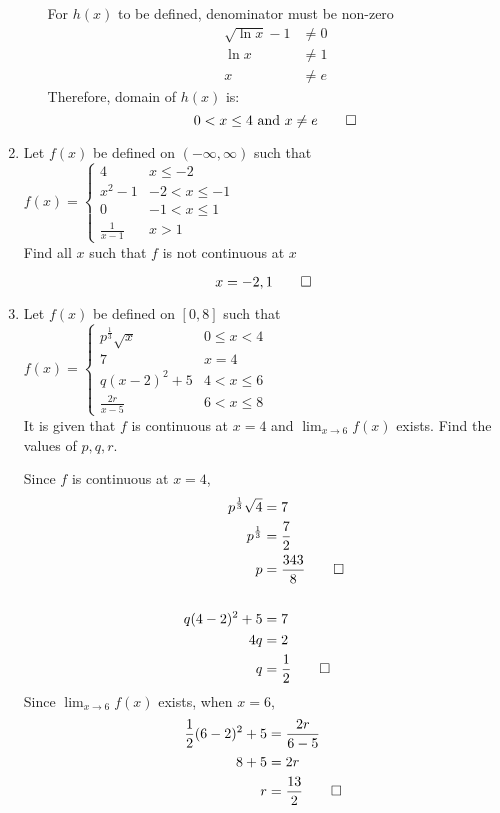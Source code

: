 \documentclass[12pt, a4paper]{article}
\begin{document}
\begin{enumerate}[Q\arabic*.]
\begin{enumerate}[(\alph*)]
      For $h(x)$ to be defined, denominator must be non-zero 
        \begin{align*}
          \sqrt{\ln x} - 1 &\neq 0 \\
          \ln x &\neq 1 \\
          x &\neq e
        \end{align*}
    Therefore, domain of \( h(x) \) is:
    \[
    0 < x \leq 4 \text{ and } x \neq e \qed
    \] 
  \end{enumerate}

\item Let $f(x)$ be defined on $(-\infty, \infty)$ such that $f(x) = \begin{cases} 
      4 & x \leq -2 \\
      x^2-1 & -2 < x\leq-1 \\
      0 & -1< x \leq 1 \\
      \displaystyle\frac{1}{x-1} & x > 1
   \end{cases}
$ \\ Find all $x$ such that $f$ is not continuous at $x$

\[
x = -2, 1 \qed
\]

\item Let $f(x)$ be defined on $[0, 8]$ such that $f(x) = \begin{cases} 
    p^\frac{1}{3}\sqrt{x} & 0 \leq x < 4 \\
      7 & x=4 \\
      q(x-2)^2 + 5 & 4 < x \leq 6 \\
      \displaystyle\frac{2r}{x-5} & 6 < x \leq 8
   \end{cases}$ \\
   It is given that $f$ is continuous at $x = 4$ and $\lim_{x\to6} f(x)$  exists. Find the values of $p, q, r$.
   
Since $f$ is continuous at $x = 4$,
\begin{align*}
  p^\frac{1}{3}\sqrt{4} &= 7 \\
  p^\frac{1}{3} &= \frac{7}{2} \\
  p &= \frac{343}{8} \qed \\
    &\\
  q(4 - 2)^2 + 5 &= 7 \\
  4q &= 2 \\ 
  q &= \frac{1}{2} \qed
\end{align*}
Since $\lim_{x\to6} f(x)$ exists, when $x = 6$,
\begin{align*}
  \frac{1}{2}(6-2)^2 + 5 &= \frac{2r}{6-5} \\
  8 + 5 &= 2r \\
  r &= \frac{13}{2} \qed
\end{align*}


\end{enumerate}
\end{document}
